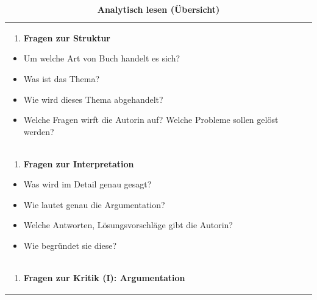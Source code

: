 \documentclass[]{book}
\providecommand{\tightlist}{%
  \setlength{\itemsep}{0pt}\setlength{\parskip}{0pt}}
\theoremstyle{definition}
\theoremstyle{definition}
\theoremstyle{definition}
\theoremstyle{remark}
\begin{document}
\begin{longtable}[]{@{}l@{}}
\caption{\textbf{\label{tab:analytisch-lesen} Analytisch lesen
(Übersicht)}}\tabularnewline
\toprule
\begin{minipage}[t]{0.97\columnwidth}\raggedright\strut
\begin{enumerate}
\def\labelenumi{\arabic{enumi}.}
\tightlist
\item
  \textbf{Fragen zur Struktur}
\end{enumerate}

\begin{itemize}
\tightlist
\item
  Um welche Art von Buch handelt es sich?
\item
  Was ist das Thema?
\item
  Wie wird dieses Thema abgehandelt?
\item
  Welche Fragen wirft die Autorin auf? Welche Probleme sollen gelöst
  werden? \vspace{-6mm}
\end{itemize}\strut
\end{minipage}\tabularnewline
\begin{minipage}[t]{0.97\columnwidth}\raggedright\strut
\begin{enumerate}
\def\labelenumi{\arabic{enumi}.}
\setcounter{enumi}{1}
\tightlist
\item
  \textbf{Fragen zur Interpretation}
\end{enumerate}

\begin{itemize}
\tightlist
\item
  Was wird im Detail genau gesagt?
\item
  Wie lautet genau die Argumentation?
\item
  Welche Antworten, Lösungsvorschläge gibt die Autorin?
\item
  Wie begründet sie diese?
\end{itemize}\strut
\end{minipage}\tabularnewline
\begin{minipage}[t]{0.97\columnwidth}\raggedright\strut
\begin{enumerate}
\def\labelenumi{\arabic{enumi}.}
\setcounter{enumi}{2}
\tightlist
\item
  \textbf{Fragen zur Kritik (I): Argumentation}
\end{enumerate}


\end{minipage}
\end{longtable}
\end{document}
